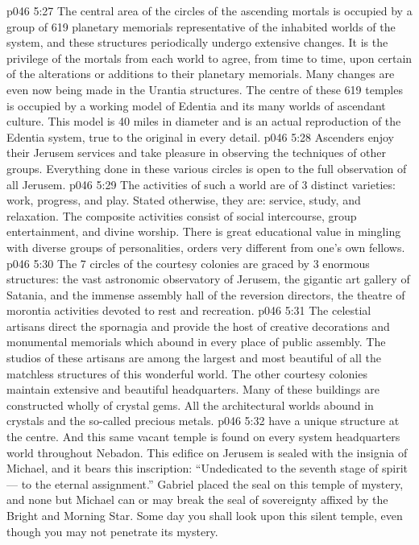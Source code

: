 \vs p046 5:27 \bibnobreakspace {} The central area of the circles of the ascending mortals is occupied by a group of 619 planetary memorials representative of the inhabited worlds of the system, and these structures periodically undergo extensive changes. It is the privilege of the mortals from each world to agree, from time to time, upon certain of the alterations or additions to their planetary memorials. Many changes are even now being made in the Urantia structures. The centre of these 619 temples is occupied by a working model of Edentia and its many worlds of ascendant culture. This model is 40 miles in diameter and is an actual reproduction of the Edentia system, true to the original in every detail.
\vs p046 5:28 Ascenders enjoy their Jerusem services and take pleasure in observing the techniques of other groups. Everything done in these various circles is open to the full observation of all Jerusem.
\vs p046 5:29 The activities of such a world are of 3 distinct varieties: work, progress, and play. Stated otherwise, they are: service, study, and relaxation. The composite activities consist of social intercourse, group entertainment, and divine worship. There is great educational value in mingling with diverse groups of personalities, orders very different from one’s own fellows.
\vs p046 5:30 \bibnobreakspace {} The 7 circles of the courtesy colonies are graced by 3 enormous structures: the vast astronomic observatory of Jerusem, the gigantic art gallery of Satania, and the immense assembly hall of the reversion directors, the theatre of morontia activities devoted to rest and recreation.
\vs p046 5:31 The celestial artisans direct the spornagia and provide the host of creative decorations and monumental memorials which abound in every place of public assembly. The studios of these artisans are among the largest and most beautiful of all the matchless structures of this wonderful world. The other courtesy colonies maintain extensive and beautiful headquarters. Many of these buildings are constructed wholly of crystal gems. All the architectural worlds abound in crystals and the so\hyp{}called precious metals.
\vs p046 5:32 \bibnobreakspace {} have a unique structure at the centre. And this same vacant temple is found on every system headquarters world throughout Nebadon. This edifice on Jerusem is sealed with the insignia of Michael, and it bears this inscription: “Undedicated to the seventh stage of spirit --- to the eternal assignment.” Gabriel placed the seal on this temple of mystery, and none but Michael can or may break the seal of sovereignty affixed by the Bright and Morning Star. Some day you shall look upon this silent temple, even though you may not penetrate its mystery.
